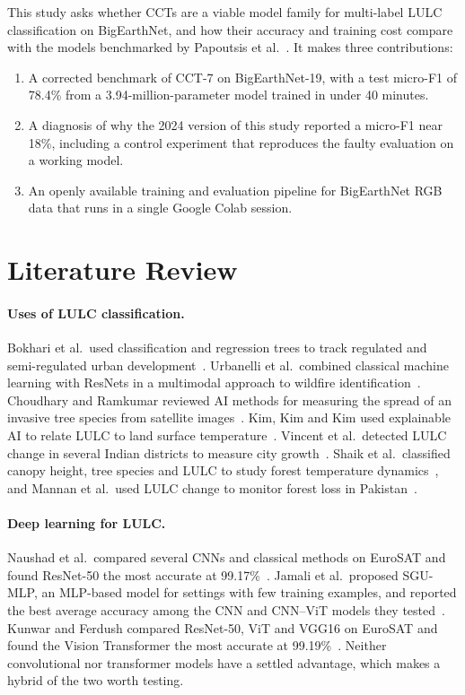 \documentclass[11pt]{article}
\begin{document}
This study asks whether CCTs are a viable model family for multi-label LULC classification on
BigEarthNet, and how their accuracy and training cost compare with the models benchmarked by Papoutsis
et al.~\cite{papoutsis}. It makes three contributions:

\begin{enumerate}
  \item A corrected benchmark of CCT-7 on BigEarthNet-19, with a test micro-F1 of 78.4\% from a
        3.94-million-parameter model trained in under 40 minutes.
  \item A diagnosis of why the 2024 version of this study reported a micro-F1 near 18\%, including a
        control experiment that reproduces the faulty evaluation on a working model.
  \item An openly available training and evaluation pipeline for BigEarthNet RGB data that runs in a
        single Google Colab session.
\end{enumerate}

\section{Literature Review}

\paragraph{Uses of LULC classification.}
Bokhari et al.\ used classification and regression trees to track regulated and semi-regulated urban
development~\cite{bokhari}. Urbanelli et al.\ combined classical machine learning with ResNets in a
multimodal approach to wildfire identification~\cite{urbanelli}. Choudhary and Ramkumar reviewed
AI methods for measuring the spread of an invasive tree species from satellite images~\cite{choudhary}.
Kim, Kim and Kim used explainable AI to relate LULC to land surface temperature~\cite{kim}. Vincent et
al.\ detected LULC change in several Indian districts to measure city growth~\cite{vincent}. Shaik et al.\
classified canopy height, tree species and LULC to study forest temperature dynamics~\cite{shaik}, and
Mannan et al.\ used LULC change to monitor forest loss in Pakistan~\cite{mannan}.

\paragraph{Deep learning for LULC.}
Naushad et al.\ compared several CNNs and classical methods on EuroSAT and found ResNet-50 the most
accurate at 99.17\%~\cite{naushad}. Jamali et al.\ proposed SGU-MLP, an MLP-based model for settings with
few training examples, and reported the best average accuracy among the CNN and CNN--ViT models they
tested~\cite{jamali}. Kunwar and Ferdush compared ResNet-50, ViT and VGG16 on EuroSAT and found the
Vision Transformer the most accurate at 99.19\%~\cite{kunwar}. Neither convolutional nor transformer models
have a settled advantage, which makes a hybrid of the two worth testing.
\end{document}
